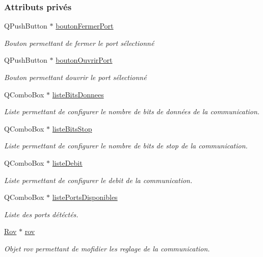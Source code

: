 \subsubsection*{Attributs privés}
\begin{DoxyCompactItemize}
\item 
Q\+Push\+Button $\ast$ \hyperlink{class_i_h_m_configuration_a25c0b3c51a8d162ae3439a56ec644909}{bouton\+Fermer\+Port}
\begin{DoxyCompactList}\small\item\em Bouton permettant de fermer le port sélectionné \end{DoxyCompactList}\item 
Q\+Push\+Button $\ast$ \hyperlink{class_i_h_m_configuration_a824b7f6c0d332b8f6f76801e545b14ad}{bouton\+Ouvrir\+Port}
\begin{DoxyCompactList}\small\item\em Bouton permettant d\textquotesingle{}ouvrir le port sélectionné \end{DoxyCompactList}\item 
Q\+Combo\+Box $\ast$ \hyperlink{class_i_h_m_configuration_a83c61d075d53758bd753aada9a0bb452}{liste\+Bits\+Donnees}
\begin{DoxyCompactList}\small\item\em Liste permettant de configurer le nombre de bits de données de la communication. \end{DoxyCompactList}\item 
Q\+Combo\+Box $\ast$ \hyperlink{class_i_h_m_configuration_a16ae724388b797983c78e87e7d5485cb}{liste\+Bits\+Stop}
\begin{DoxyCompactList}\small\item\em Liste permettant de configurer le nombre de bits de stop de la communication. \end{DoxyCompactList}\item 
Q\+Combo\+Box $\ast$ \hyperlink{class_i_h_m_configuration_a98e8133a04509b3a80b232d2f031e81f}{liste\+Debit}
\begin{DoxyCompactList}\small\item\em Liste permettant de configurer le debit de la communication. \end{DoxyCompactList}\item 
Q\+Combo\+Box $\ast$ \hyperlink{class_i_h_m_configuration_af3ce74444e24237aedf1d2ef2053b574}{liste\+Ports\+Disponibles}
\begin{DoxyCompactList}\small\item\em Liste des ports détéctés. \end{DoxyCompactList}\item 
\hyperlink{class_rov}{Rov} $\ast$ \hyperlink{class_i_h_m_configuration_a75a7e5b7312d9eb3377bc96372fc0b3a}{rov}
\begin{DoxyCompactList}\small\item\em Objet rov permettant de mofidier les reglage de la communication. \end{DoxyCompactList}\end{DoxyCompactItemize}



